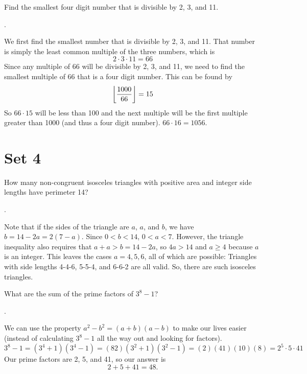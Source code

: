\documentclass[11pt]{article}
\DeclareRobustCommand{\frac}[3][0pt]{%
  {\begingroup\hspace{#1}#2\hspace{#1}\endgroup\over\hspace{#1}#3\hspace{#1}}}
\begin{document}
\begin{problem}Find the smallest four digit number that is divisible by 2, 3, and 11.
\end{problem}
\begin{answer}
.
\end{answer}
\begin{solution}
We first find the smallest number that is divisible by 2, 3, and 11. That number is simply the least common multiple of the three numbers, which is
$$2\cdot 3\cdot 11=66$$
Since any multiple of 66 will be divisible by 2, 3, and 11, we need to find the smallest multiple of 66 that is a four digit number. This can be found by
$$\floor{\frac{1000}{66}}=15$$
So $66 \cdot 15$ will be less than 100 and the next multiple will be the first multiple greater than 1000 (and thus a four digit number). $66 \cdot 16 = \boxed{1056}.$
\end{solution}

\eject

\section*{Set 4}

\begin{problem}
How many non-congruent isosceles triangles with positive area and integer side lengths have perimeter 14?
\end{problem}
\begin{answer}
.
\end{answer}
\begin{solution}
Note that if the sides of the triangle are $a$, $a$, and $b$, we have $b = 14 - 2a = 2(7 - a)$. Since $0 < b < 14$, $0 < a < 7$. However, the triangle inequality also requires that $a + a > b = 14 - 2a$, so $4a > 14$ and $a \geq 4$ because $a$ is an integer. This leaves the cases $a = 4, 5, 6$, all of which are possible: Triangles with side lengths 4-4-6, 5-5-4, and 6-6-2 are all valid. So, there are  such isosceles triangles.
\end{solution}

\begin{problem}
What are the sum of the prime factors of $3^{8}-1$?
\end{problem}
\begin{answer}
.
\end{answer}
\begin{solution}
We can use the property $a^2-b^2 = (a+b)(a-b)$ to make our lives easier (instead of calculating $3^8-1$ all the way out and looking for factors).
$$3^8-1 = (3^4+1)(3^4-1) = (82)(3^2+1)(3^2-1)=(2)(41)(10)(8)=2^5 \cdot 5 \cdot 41$$
Our prime factors are 2, 5, and 41, so our answer is
$$2+5+41 = \boxed{48}.$$
\end{solution}
\end{document}
